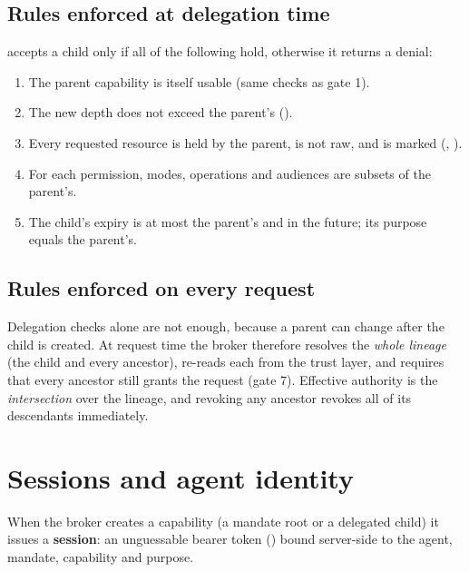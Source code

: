 \documentclass[11pt,a4paper]{article}
\begin{document}
\subsection{Rules enforced at delegation time}
 accepts a child only if all of the following hold, otherwise it returns a denial:
\begin{enumerate}[label=\textbf{\color{violet}\arabic*.}]
  \item The parent capability is itself usable (same checks as gate 1).
  \item The new depth does not exceed the parent's  ().
  \item Every requested resource is held by the parent, is not raw, and is marked  (, ).
  \item For each permission, modes, operations and audiences are subsets of the parent's.
  \item The child's expiry is at most the parent's and in the future; its purpose equals the parent's.
\end{enumerate}

\subsection{Rules enforced on every request}
Delegation checks alone are not enough, because a parent can change after the child is created. At request time the broker therefore resolves the \emph{whole lineage} (the child and every ancestor), re-reads each from the trust layer, and requires that every ancestor still grants the request (gate 7). Effective authority is the \emph{intersection} over the lineage, and revoking any ancestor revokes all of its descendants immediately.

\section{Sessions and agent identity}\label{sec:sessions}

When the broker creates a capability (a mandate root or a delegated child) it issues a \textbf{session}: an unguessable bearer token () bound server-side to the agent, mandate, capability and purpose.
\end{document}
